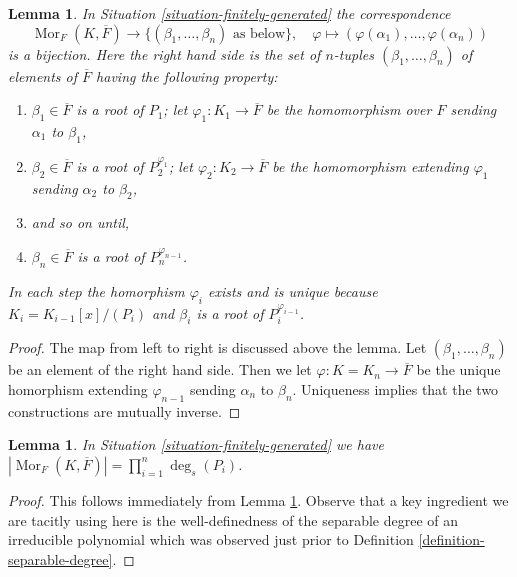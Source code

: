 \documentclass{stacks-project}
\theoremstyle{plain}
\newtheorem{lemma}[subsection]{Lemma}
\theoremstyle{definition}
\theoremstyle{remark}
\numberwithin{equation}{subsection}
\def\Mor{\mathop{\mathrm{Mor}}\nolimits}
\begin{document}
\begin{lemma}
\label{lemma-count-embeddings}
In Situation \ref{situation-finitely-generated} the correspondence
$$
\Mor_F(K, \overline{F})
\longrightarrow
\{(\beta_1, \ldots, \beta_n)\text{ as below}\},
\quad
\varphi \longmapsto (\varphi(\alpha_1), \ldots, \varphi(\alpha_n))
$$
is a bijection. Here the right hand side is the set of $n$-tuples
$(\beta_1, \ldots, \beta_n)$ of elements of $\overline{F}$ having
the following property:
\begin{enumerate}
\item $\beta_1 \in \overline{F}$ is a root of $P_1$;
let $\varphi_1 : K_1 \to \overline{F}$ be the homomorphism
over $F$ sending $\alpha_1$ to $\beta_1$,
\item $\beta_2 \in \overline{F}$ is a root of $P_2^{\varphi_1}$;
let $\varphi_2 : K_2 \to \overline{F}$ be the homomorphism
extending $\varphi_1$ sending $\alpha_2$ to $\beta_2$,
\item and so on until,
\item $\beta_n \in \overline{F}$ is a root of $P_n^{\varphi_{n - 1}}$.
\end{enumerate}
In each step the homorphism $\varphi_i$ exists and is unique because
$K_i = K_{i - 1}[x]/(P_i)$ and $\beta_i$ is a root of $P_i^{\varphi_{i - 1}}$.
\end{lemma}

\begin{proof}
The map from left to right is discussed above the lemma.
Let $(\beta_1, \ldots, \beta_n)$ be an element of the right hand side.
Then we let $\varphi : K = K_n \to \overline{F}$ be the unique homorphism
extending $\varphi_{n - 1}$ sending $\alpha_n$ to $\beta_n$.
Uniqueness implies that the two constructions are mutually inverse.
\end{proof}

\begin{lemma}
\label{lemma-count-embeddings-explicitly}
In Situation \ref{situation-finitely-generated} we have
$|\Mor_F(K, \overline{F})| = \prod_{i = 1}^n \deg_s(P_i)$.
\end{lemma}

\begin{proof}
This follows immediately from Lemma \ref{lemma-count-embeddings}.
Observe that a key ingredient we are tacitly using here is the
well-definedness of the separable degree of an irreducible polynomial
which was observed just prior to
Definition \ref{definition-separable-degree}.
\end{proof}
\end{document}
